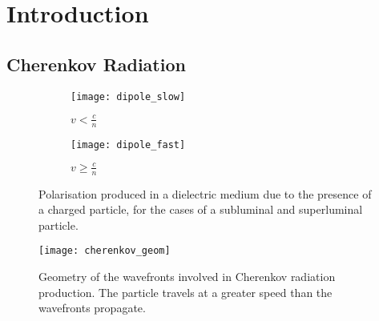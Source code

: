 \chapter{\label{ch1-intro}Introduction} 

\minitoc

\section{Cherenkov Radiation}

\begin{figure}
  \begin{subfigure}[b]{0.49\textwidth}
    \texttt{[image: dipole\_slow]}
    \caption{$v < \frac{c}{n}$}
    \label{fig:dipole_slow}
  \end{subfigure}
  \hfill
  \begin{subfigure}[b]{0.49\textwidth}
    \texttt{[image: dipole\_fast]}
    \caption{$v \ge \frac{c}{n}$}
    \label{fig:dipole_fast}
  \end{subfigure}
  \caption[Polarisation produced in a dielectric medium due to the presence of a charged particle.]{Polarisation produced in a dielectric medium due to the presence of a charged particle, for the cases of a subluminal and superluminal particle.}
\end{figure}

\begin{figure}
	\centering\texttt{[image: cherenkov\_geom]} 
	\caption[Geometry of the wavefronts involved in Cherenkov radiation production.]{Geometry of the wavefronts involved in Cherenkov radiation production. The particle travels at a greater speed than the wavefronts propagate.}
	\label{fig:cherenkov_geom}
\end{figure}

